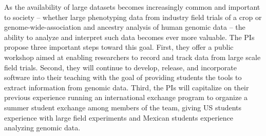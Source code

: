 
%




As the availability of large datasets becomes increasingly common and important to society -- whether large phenotyping data from industry field trials of a crop or genome-wide-association and ancestry analysis of human genomic data -- the ability to analyze and interpret such data becomes ever more valuable. The PIs propose three important steps toward this goal.  First, they offer a public workshop aimed at enabling researchers to record and track data from large scale field trials.  Second, they will continue to develop, release, and incorporate software into their teaching with the goal of providing students  the tools to extract information from genomic data.  Third, the PIs will capitalize on their previous experience running an international exchange program to organize a summer student exchange among members of the team, giving US students experience with large field experiments and Mexican students experience analyzing genomic data. 

